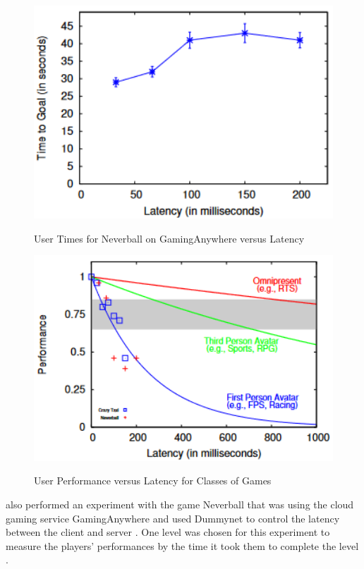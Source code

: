 \begin{figure}[H]
	\centering
	\includegraphics[width=12cm]{../img/fig23.png}
	\caption{User Times for Neverball on GamingAnywhere versus Latency}
	\parencite[Chapter 4, Figure 7]{claypool2014effects}
\end{figure}
\begin{figure}[H]
	\centering
	\includegraphics[width=12cm]{../img/fig24.png}
	\caption{User Performance versus Latency for Classes of Games}
	\parencite[Chapter 4, Figure 8]{claypool2014effects}
\end{figure}
\textcite{anouna2014network} also performed an experiment with the game Neverball that was using the cloud gaming service GamingAnywhere and used Dummynet to control the latency between the client and server \parencite[Chapter 3.2, Page 6]{anouna2014network}. One level was chosen for this experiment to measure the players' performances by the time it took them to complete the level \parencite[Chapter 4.1, Page 15]{anouna2014network}.
